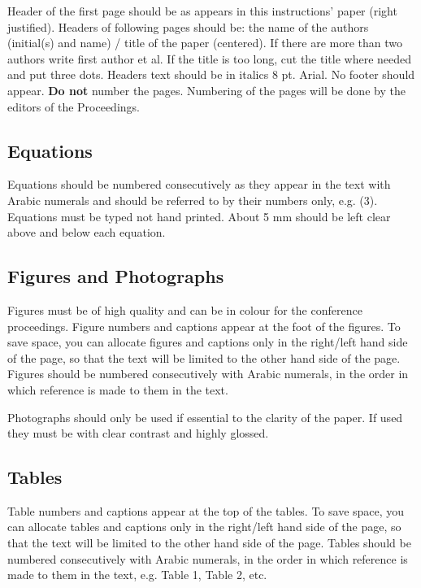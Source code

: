 \documentclass[a4paper]{article}
\begin{document}
Header of the first page should be as appears in this instructions' paper (right justified). Headers of following pages should be: the name of the authors (initial(s) and name) / title of the paper (centered). If there are more than two authors write first author et al. If the title is too long, cut the title where needed and put three dots. Headers text should be in italics 8 pt. Arial.
No footer should appear. \textbf{Do not} number the pages. Numbering of the pages will be done by the editors of the Proceedings.


\subsection{Equations}
Equations should be numbered consecutively as they appear in the
text with Arabic numerals and should be referred to by their
numbers only, e.g. (3).  Equations must be typed not hand printed.
About 5 mm should be left clear above and below each equation.


\subsection{Figures and Photographs}
Figures must be of high quality and can be in colour for the conference proceedings. Figure numbers and captions appear at the foot of the figures. To save space, you can allocate figures and captions only in the right/left hand side of the page, so that the text will be limited to the other hand side of the page. Figures should be numbered consecutively with Arabic numerals, in the order in which reference is made to them in the text.





Photographs should only be used if essential to the clarity of the paper.  If used they must be with clear contrast and highly glossed.

\subsection{Tables}
Table numbers and captions appear at the top of the tables. To save space, you can allocate tables and captions only in the right/left hand side of the page, so that the text will be limited to the other hand side of the page. Tables should be numbered consecutively with Arabic numerals, in the order in which reference is made to them in the text, e.g. Table 1, Table 2, etc.
\end{document}
